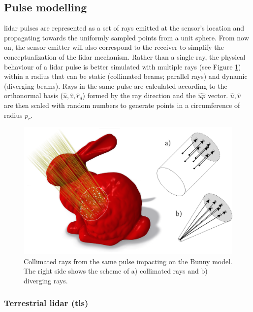 \subsection{Pulse modelling}

\acrshort{lidar} pulses are represented as a set of rays emitted at the sensor's location and propagating towards the uniformly sampled points from a unit sphere. From now on, the sensor emitter will also correspond to the receiver to simplify the conceptualization of the \acrshort{lidar} mechanism. Rather than a single ray, the physical behaviour of a \acrshort{lidar} pulse is better simulated with multiple rays \cite{zohdi_rapid_2020} (see Figure \ref{fig:pulse_radius_insight}) within a radius that can be static (collimated beams; parallel rays) and dynamic (diverging beams). Rays in the same pulse are calculated according to the orthonormal basis ($\hat{u}, \hat{v}, \hat{r}_{d}$) formed by the ray direction and the $\hat{\textit{up}}$ vector. $\hat{u}, \hat{v}$ are then scaled with random numbers to generate points in a circumference of radius $p_r$. 

\begin{figure}[ht]
	\centering
	\includegraphics[width=.7\linewidth]{figs/lidar_simulation/ray_section.png}
	\caption{Collimated rays from the same pulse impacting on the Bunny model. The right side shows the scheme of a) collimated rays and b) diverging rays.}
	\label{fig:pulse_radius_insight}
\end{figure}

\subsubsection{Terrestrial \acrshort{lidar} (\acrshort{tls})}

